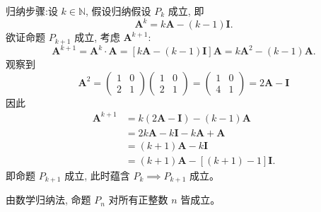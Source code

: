 \begin{questions}
\begin{solution}
        归纳步骤:设 $k \in \mathbb{N}$, 假设归纳假设 $P_k$ 成立, 即
        \[
        \mathbf{A}^k = k\mathbf{A} - (k-1)\mathbf{I}.
        \]
        欲证命题 $P_{k+1}$ 成立, 考虑 $\mathbf{A}^{k+1}$:
        \[
        \mathbf{A}^{k+1} = \mathbf{A}^k \cdot \mathbf{A} = [k\mathbf{A} - (k-1)\mathbf{I}] \mathbf{A} = k\mathbf{A}^2 - (k-1)\mathbf{A}.
        \]
        观察到
        \[
        \mathbf{A}^2 = \begin{pmatrix} 1 & 0 \\ 2 & 1 \end{pmatrix} \begin{pmatrix} 1 & 0 \\ 2 & 1 \end{pmatrix} = \begin{pmatrix} 1 & 0 \\ 4 & 1 \end{pmatrix}=2\mathbf{A} - \mathbf{I}
        \]
        因此
        \begin{align}
        \mathbf{A}^{k+1} &= k(2\mathbf{A} - \mathbf{I}) - (k-1)\mathbf{A} \\
        &= 2k\mathbf{A} - k\mathbf{I} - k\mathbf{A} + \mathbf{A} \\
        &= (k+1)\mathbf{A} - k\mathbf{I} \\
        &= (k+1)\mathbf{A} - [(k+1)-1]\mathbf{I}.
        \end{align}
        即命题 $P_{k+1}$ 成立, 此时蕴含 $P_k \implies P_{k+1}$ 成立。

        由数学归纳法, 命题 $P_n$ 对所有正整数 $n$ 皆成立。
    \end{solution}


\end{questions}
